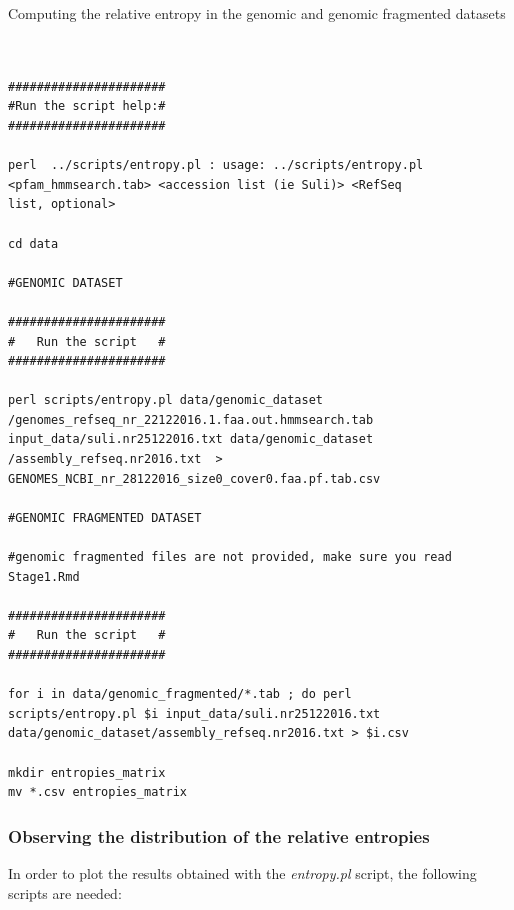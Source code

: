 \documentclass[12pt]{report}
\begin{document}
Computing the relative entropy in the genomic and genomic fragmented datasets 

\begin{verbatim}


######################
#Run the script help:#
######################

perl  ../scripts/entropy.pl : usage: ../scripts/entropy.pl 
<pfam_hmmsearch.tab> <accession list (ie Suli)> <RefSeq 
list, optional>

cd data

#GENOMIC DATASET

######################
#   Run the script   #
######################

perl scripts/entropy.pl data/genomic_dataset
/genomes_refseq_nr_22122016.1.faa.out.hmmsearch.tab 
input_data/suli.nr25122016.txt data/genomic_dataset
/assembly_refseq.nr2016.txt  > 
GENOMES_NCBI_nr_28122016_size0_cover0.faa.pf.tab.csv

#GENOMIC FRAGMENTED DATASET  

#genomic fragmented files are not provided, make sure you read 
Stage1.Rmd 

######################
#   Run the script   #
######################

for i in data/genomic_fragmented/*.tab ; do perl 
scripts/entropy.pl $i input_data/suli.nr25122016.txt 
data/genomic_dataset/assembly_refseq.nr2016.txt > $i.csv 

mkdir entropies_matrix
mv *.csv entropies_matrix

\end{verbatim}

\subsubsection{Observing the distribution of the relative entropies}


In order to plot the results obtained with the \textit{entropy.pl} script, the following scripts are needed:   
\end{document}

